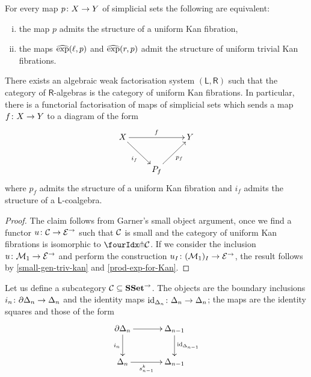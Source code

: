 \documentclass[reqno,10pt,a4paper,oneside]{amsart}
\begin{document}
 \begin{lemma} \label{prod-exp-for-Kan}  For every  map $p \co X \to Y$ of simplicial sets the following are equivalent: 
\begin{enumerate}[(i)]
\item the map $p$ admits the structure of a uniform Kan fibration,
\item the maps $\hatexp(\intervall, p)$ and $\hatexp(\intervalr, p)$ admit the structure of
uniform trivial Kan fibrations. 
\end{enumerate} 
\end{lemma}

\begin{proposition} There exists an algebraic weak factorisation system $(\mathsf{L}, \mathsf{R})$
such that the category of $\mathsf{R}$-algebras is the category of uniform Kan fibrations. 
In particular, there is a functorial factorisation of maps of simplicial sets which sends
a map $f \co X \to Y$ to a diagram of the form
\[
\xymatrix{ 
X \ar[rr]^f \ar[dr]_{i_f}  & & Y \\
 & P_f \ar[ur]_{p_f} }
 \]
 where $p_f$ admits the structure of  a uniform Kan fibration and 
 $i_f$ admits the structure of a $\mathsf{L}$-coalgebra.
\end{proposition} 

\begin{proof} The claim follows from Garner's small object argument, once we find a 
functor $u \co \cal{C} \rightarrow \catE^\to$ such that $\cal{C}$ is small and the
category of uniform Kan fibrations is isomorphic to $\liftr{\cal{C}}$. If we consider
the inclusion $u \co \mathcal{M}_1 \to \cal{E}^\to$ and perform the construction
$u_\interval \co (\mathcal{M}_1)_\interval \to \catE^\to$, the result follows 
by \cref{small-gen-triv-kan} and \cref{prod-exp-for-Kan}. 
\end{proof}


\medskip
 
Let us define a subcategory $\cal{C} \subseteq \SSet^\to$. The objects are the boundary inclusions
$i_n \co \partial \Delta_n \to \Delta_n$ and the identity maps $\id_{\Delta_n} \co \Delta_n \to \Delta_n$; the
maps are the identity squares and those of the form
 \[
\xymatrix@C=1.2cm{
  \partial \Delta_n
  \ar[r]
  \ar[d]_{i_n}
&
  \Delta_{n-1}
  \ar[d]^{\id_{\Delta_{n-1}}}
\\
  \Delta_n
  \ar[r]_-{s^k_{n-1}}
&
  \Delta_{n-1}
}
\] 
\end{document}
